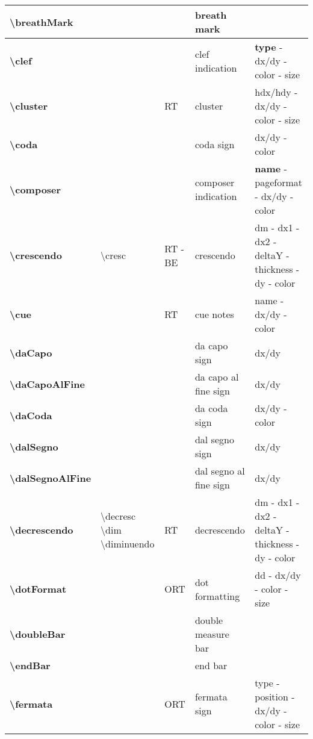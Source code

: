 \documentclass[a4paper, landscape, 10pt]{article}
\begin{document}
\begin{tabularx}{\linewidth}{p{3cm}p{4.5cm}p{3cm}p{5.5cm}l}
    \textbf{\textbackslash{}breathMark}&&&breath mark&\\
    \hline
    \textbf{\textbackslash{}clef}&&&clef indication&\textbf{type} - dx/dy - color - size\\
    \hline
    \textbf{\textbackslash{}cluster}&&RT&cluster&hdx/hdy - dx/dy - color - size\\
    \hline
    \textbf{\textbackslash{}coda}&&&coda sign&dx/dy - color\\
    \hline
    \textbf{\textbackslash{}composer}&&&composer indication&\textbf{name} - pageformat - dx/dy - color\\
    \hline
    \textbf{\textbackslash{}crescendo}&\textbackslash{}cresc&RT - BE&crescendo&dm - dx1 - dx2 - deltaY - thickness - dy - color\\
    \hline
	\textbf{\textbackslash{}cue}&&RT&cue notes&name - dx/dy - color\\
    \hline
    \textbf{\textbackslash{}daCapo}&&&da capo sign&dx/dy\\
    \hline
    \textbf{\textbackslash{}daCapoAlFine}&&&da capo al fine sign&dx/dy\\
    \hline
    \textbf{\textbackslash{}daCoda}&&&da coda sign&dx/dy - color\\
    \hline
    \textbf{\textbackslash{}dalSegno}&&&dal segno sign&dx/dy\\
    \hline
    \textbf{\textbackslash{}dalSegnoAlFine}&&&dal segno al fine sign&dx/dy\\
    \hline
    \textbf{\textbackslash{}decrescendo}&\textbackslash{}decresc \textbackslash{}dim \textbackslash{}diminuendo&RT&decrescendo&dm - dx1 - dx2 - deltaY - thickness - dy - color\\
    \hline
    \textbf{\textbackslash{}dotFormat}&&ORT&dot formatting&dd - dx/dy - color - size\\
    \hline
    \textbf{\textbackslash{}doubleBar}&&&double measure bar&\\
    \hline
    \textbf{\textbackslash{}endBar}&&&end bar&\\
    \hline
    \textbf{\textbackslash{}fermata}&&ORT&fermata sign&type - position - dx/dy - color - size\\

\end{tabularx}
\end{document}
